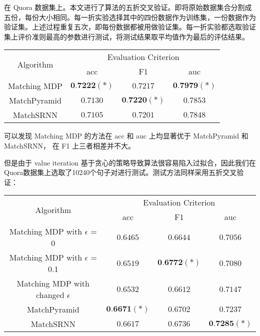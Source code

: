 在 Quora 数据集上。本文进行了算法的五折交叉验证。即将原始数据集合分割成五份，每份大小相同。每一折实验选择其中的四份数据作为训练集，一份数据作为验证集。上述过程重复五次，即每份数据都被用做验证集。每一折实验都选取验证集上评价准则最高的参数进行测试，将测试结果取平均值作为最后的评估结果。

\begin{table}[!htbp]
    \label{tab:MDP_test}
    \centering
    \footnotesize%
    \setlength{\tabcolsep}{4pt}%
    \renewcommand{\arraystretch}{1.2}%
    \begin{tabular}{cccc}
        \hline
        \multirow{2}{*}{Algorithm} &
        \multicolumn{3}{c}{\multirow{1}{*}{Evaluation Criterion}} \\
        \cline{2-4} & acc & F1 & auc \\
        \hline
        Matching MDP & $\textbf{0.7222}(*)$ & $0.7217$ & $\textbf{0.7979}(*)$ \\
        MatchPyramid & $0.7130$ & $\textbf{0.7220}(*)$ & $0.7853$ \\
        MatchSRNN & $0.7105$ & $0.7201$ & $0.7848$\\
        \hline
    \end{tabular}
\end{table}

可以发现 Matching MDP 的方法在 acc 和 auc 上均显著优于 MatchPyramid 和 MatchSRNN， 在 F1 上三者相差并不大。

但是由于 value iteration 基于贪心的策略导致算法很容易陷入过拟合，因此我们在Quora数据集上选取了10240个句子对进行测试。测试方法同样采用五折交叉验证：

\begin{table}[H]
    \label{tab:MDP_small_test}
    \centering
    \footnotesize%
    \setlength{\tabcolsep}{4pt}%
    \renewcommand{\arraystretch}{1.2}%
    \begin{tabular}{cccc}
        \hline
        \multirow{2}{*}{Algorithm} &
        \multicolumn{3}{c}{\multirow{1}{*}{Evaluation Criterion}} \\
        \cline{2-4} & acc & F1 & auc \\
        \hline
        Matching MDP with $\epsilon$ = 0 & $0.6465$ & $0.6644$ & $0.7056$ \\
        Matching MDP with $\epsilon$ = 0.1 & $0.6519$ & $\textbf{0.6772}(*)$ & $0.7080$ \\
        Matching MDP with changed $\epsilon$ & $0.6532$ & $0.6612$ & $0.7147$ \\
        \hline
        MatchPyramid & $\textbf{0.6671}(*)$ & $0.6702$ & $0.7237$ \\
        \hline
        MatchSRNN & $0.6617$ & $0.6736$ & $\textbf{0.7285}(*)$\\
        \hline
    \end{tabular}
\end{table}


